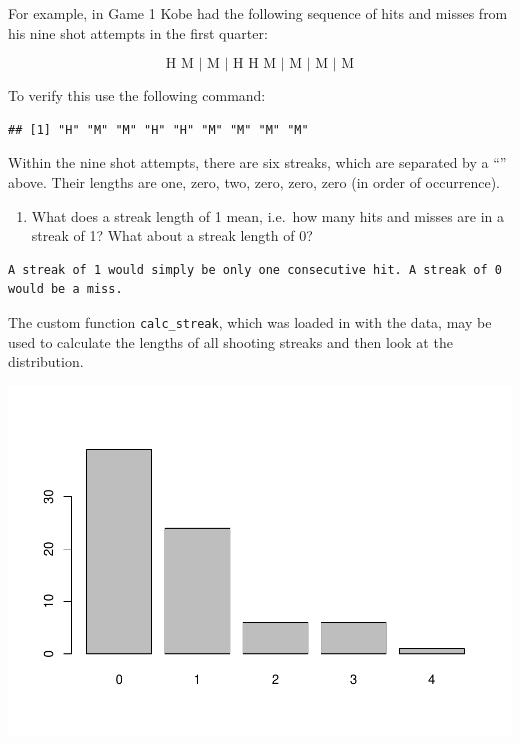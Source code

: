 \documentclass[]{article}
\newenvironment{Shaded}{\begin{snugshade}}{\end{snugshade}}
\newcommand{\KeywordTok}[1]{\textcolor[rgb]{0.13,0.29,0.53}{\textbf{{#1}}}}
\newcommand{\DecValTok}[1]{\textcolor[rgb]{0.00,0.00,0.81}{{#1}}}
\newcommand{\StringTok}[1]{\textcolor[rgb]{0.31,0.60,0.02}{{#1}}}
\newcommand{\NormalTok}[1]{{#1}}
\providecommand{\tightlist}{%
  \setlength{\itemsep}{0pt}\setlength{\parskip}{0pt}}
\begin{document}
For example, in Game 1 Kobe had the following sequence of hits and
misses from his nine shot attempts in the first quarter:

\[ \textrm{H M | M | H H M | M | M | M} \]

To verify this use the following command:

\begin{Shaded}
\end{Shaded}

\begin{verbatim}
## [1] "H" "M" "M" "H" "H" "M" "M" "M" "M"
\end{verbatim}

Within the nine shot attempts, there are six streaks, which are
separated by a ``\textbar{}'' above. Their lengths are one, zero, two,
zero, zero, zero (in order of occurrence).

\begin{enumerate}
\def\labelenumi{\arabic{enumi}.}
\tightlist
\item
  What does a streak length of 1 mean, i.e.~how many hits and misses are
  in a streak of 1? What about a streak length of 0?
\end{enumerate}

\begin{verbatim}
A streak of 1 would simply be only one consecutive hit. A streak of 0 would be a miss.
\end{verbatim}

The custom function \texttt{calc\_streak}, which was loaded in with the
data, may be used to calculate the lengths of all shooting streaks and
then look at the distribution.

\begin{Shaded}
\end{Shaded}

\includegraphics{Lab2_files/figure-latex/calc-streak-kobe-1.pdf}
\end{document}
